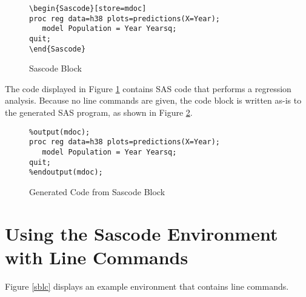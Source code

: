 \documentclass[article,oneside]{memoir}
\begin{document}
\begin{figure}[H]
\begin{snugshade}
\begin{verbatim} 
\begin{Sascode}[store=mdoc]
proc reg data=h38 plots=predictions(X=Year);
   model Population = Year Yearsq;
quit;
\end{Sascode}
\end{verbatim}
\end{snugshade}
\caption{Sascode Block}\label{sb}
\end{figure}
  The code displayed in Figure \ref{sb} contains SAS code that
performs a regression analysis. Because no line commands are given,
the code block is written as-is to the generated SAS program, as shown 
in Figure \ref{figsb}.
\begin{figure}[H]
\begin{snugshade}
\begin{verbatim} 
%output(mdoc);
proc reg data=h38 plots=predictions(X=Year);
   model Population = Year Yearsq;
quit;
%endoutput(mdoc);
\end{verbatim}
\end{snugshade}
\caption{Generated Code from Sascode Block }\label{figsb}
\end{figure}

\section{Using the Sascode Environment with Line Commands}\label{scexlc}
Figure \ref{sblc} displays an example
   environment that contains line commands.
  
\end{document}
